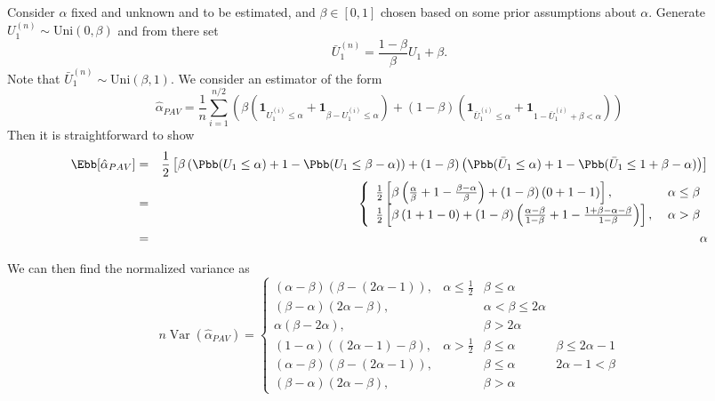 \documentclass[11pt]{article}
\DeclareMathOperator{\var}{Var}
\begin{document}
Consider $\alpha$ fixed and unknown and to be estimated, and $\beta \in [0,1]$ chosen based on some prior assumptions about $\alpha$. Generate $U_{1}^{(n)} \sim \mathrm{Uni}(0,\beta)$ and from there set
\begin{equation}
\bar{U}_{1}^{(n)} = \frac{1-\beta}{\beta} U_1 + \beta.
\end{equation}
Note that $\bar{U}_{1}^{(n)} \sim \mathrm{Uni}(\beta,1)$. We consider an estimator of the form
\begin{equation}
\hat{\alpha}_{PAV} = \frac{1}{n} \sum_{i=1}^{n/2} \left( \beta \left( \mathbf{1}_{U_{1}^{(i)} \leq \alpha} + \mathbf{1}_{\beta-U_{1}^{(i)} \leq \alpha} \right) + (1-\beta) \left( \mathbf{1}_{\bar{U}_{1}^{(i)} \leq \alpha} + \mathbf{1}_{1-\bar{U}_{1}^{(i)} + \beta < \alpha} \right) \right)
\end{equation}
Then it is straightforward to show
\begin{eqnarray}
\Ebb[\hat{\alpha}_{PAV}] &=& \frac{1}{2} \left[ \beta \left( \Pbb(U_1 \leq \alpha) + 1 - \Pbb(U_1 \leq \beta - \alpha) \right) + (1-\beta) \left( \Pbb(\bar{U}_1 \leq \alpha) + 1 - \Pbb( \bar{U}_1 \leq 1+ \beta - \alpha) \right) \right] \nonumber \\
&=& \left\{ \begin{array}{ll}
\frac{1}{2} \left[ \beta \left( \frac{\alpha}{\beta} + 1 - \frac{\beta-\alpha}{\beta} \right) + (1-\beta) \left(0 + 1 - 1 \right) \right] , \; & \alpha \leq \beta \\
\frac{1}{2} \left[ \beta \left(1 + 1 - 0 \right) + (1-\beta) \left( \frac{\alpha-\beta}{1-\beta} + 1 - \frac{1+\beta-\alpha-\beta}{1-\beta} \right) \right], \; & \alpha > \beta 
\end{array} \right. \nonumber \\
&=& \alpha
\end{eqnarray}

We can then find the normalized variance as
\begin{equation}n\var(\hat{\alpha}_{PAV}) = \left\{
\begin{array}{llll}
(\alpha-\beta)(\beta-(2\alpha-1)), & \alpha \leq \frac{1}{2} & \beta \leq \alpha & \\
(\beta-\alpha)(2\alpha-\beta), & & \alpha < \beta \leq 2 \alpha &  \\
\alpha(\beta-2\alpha), & & \beta > 2 \alpha & \\
(1-\alpha)((2\alpha-1)-\beta), & \alpha > \frac{1}{2} & \beta \leq \alpha & \beta \leq 2 \alpha - 1 \\
(\alpha-\beta)(\beta - (2\alpha-1)), & & \beta \leq \alpha & 2 \alpha - 1 < \beta \\
(\beta-\alpha)(2\alpha-\beta), & & \beta > \alpha 
\end{array}\right.
\end{equation}
\end{document}
